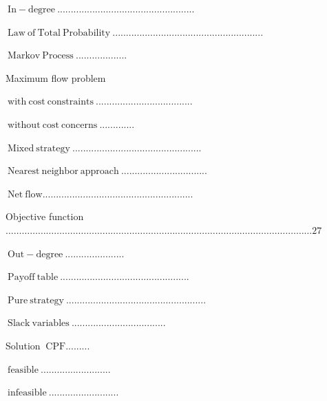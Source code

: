\documentclass[10pt]{article}
\begin{document}
$\mathrm{~ I n - d e g r e e ~ . . . . . . . . . . . . . . . . . . . . . . . . . . . . . . . . . . . . . . . . . . . . . . . . . . .}$

$\mathrm{~ L a w ~ o f ~ T o t a l ~ P r o b a b i l i t y ~ . . . . . . . . . . . . . . . . . . . . . . . . . . . . . . . . . . . . . . . . . . . . . . . . . . . . . . . .}$

$\mathrm{~ M a r k o v ~ P r o c e s s ~ . . . . . . . . . . . . . . . . . . .}$

Maximum flow problem

$\mathrm{~ w i t h ~ c o s t ~ c o n s t r a i n t s ~ . . . . . . . . . . . . . . . . . . . . . . . . . . . . . . . . . . . .}$

$\mathrm{~ w i t h o u t ~ c o s t ~ c o n c e r n s ~ . . . . . . . . . . . . .}$

$\mathrm{~ M i x e d ~ s t r a t e g y ~ . . . . . . . . . . . . . . . . . . . . . . . . . . . . . . . . . . . . . . . . . . . . . . . .}$

$\mathrm{~ N e a r e s t ~ n e i g h b o r ~ a p p r o a c h ~ . . . . . . . . . . . . . . . . . . . . . . . . . . . . . . . .}$

$\mathrm{~ N e t ~ f l o w . . . . . . . . . . . . . . . . . . . . . . . . . . . . . . . . . . . . . . . . . . . . . . . . . . . . . . . .}$

Objective function $\ldots \ldots \ldots \ldots \ldots \ldots \ldots \ldots \ldots \ldots \ldots \ldots \ldots \ldots \ldots \ldots \ldots \ldots \ldots \ldots \ldots \ldots \ldots \ldots \ldots \ldots \ldots \ldots \ldots \ldots \ldots \ldots \ldots \ldots \ldots \ldots \ldots \ldots 27$

$\mathrm{~ O u t - d e g r e e ~ . . . . . . . . . . . . . . . . . . . . . .}$

$\mathrm{~ P a y o f f ~ t a b l e ~ . . . . . . . . . . . . . . . . . . . . . . . . . . . . . . . . . . . . . . . . . . . . . . . .}$

$\mathrm{~ P u r e ~ s t r a t e g y ~ . . . . . . . . . . . . . . . . . . . . . . . . . . . . . . . . . . . . . . . . . . . . . . . . . . . .}$

$\mathrm{~ S l a c k ~ v a r i a b l e s ~ . . . . . . . . . . . . . . . . . . . . . . . . . . . . . . . . . . .}$

Solution $\mathrm{~ C P F . . . . . . . . .}$

$\mathrm{~ f e a s i b l e ~ . . . . . . . . . . . . . . . . . . . . . . . . . .}$

$\mathrm{~ i n f e a s i b l e ~ . . . . . . . . . . . . . . . . . . . . . . . . . .}$
\end{document}
